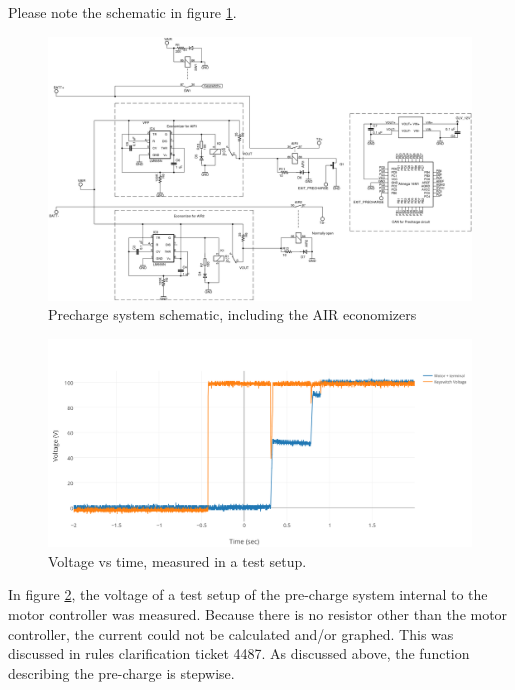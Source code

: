 \documentclass{article}
\begin{document}
        
        Please note the schematic in figure \ref{prechargeschem}. 
            
        \begin{figure}
            \includegraphics[width=\textheight]{precharge}
            \caption{Precharge system schematic, including the AIR economizers}
            \label{prechargeschem}
        \end{figure}
            
            \begin{figure}[H]
                \centering
                \includegraphics[width = 0.8 \textwidth]{PrechargeVoltage}
                \caption{Voltage vs time, measured in a test setup. }
                \label{PCvoltage}
            \end{figure}

            In figure \ref{PCvoltage}, the voltage of a test setup of the pre-charge system internal to the motor controller was measured. Because there is no resistor other than the motor controller, the current could not be calculated and/or graphed. This was discussed in rules clarification ticket 4487. As discussed above, the function describing the pre-charge is stepwise.
            
\end{document}
